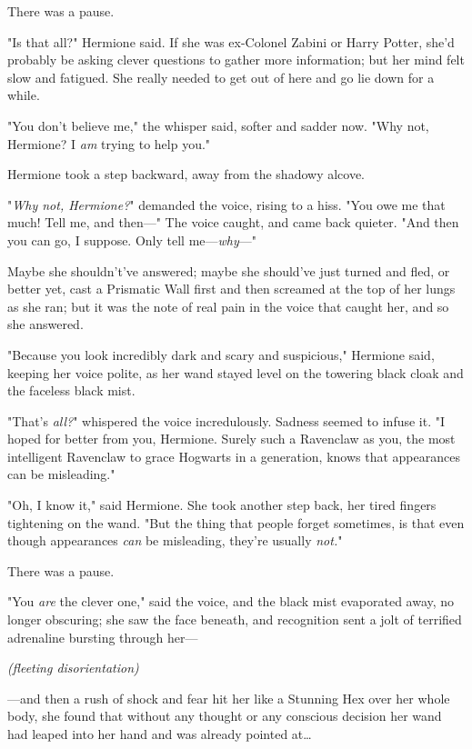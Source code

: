 There was a pause.

"Is that all?" Hermione said. If she was ex-Colonel Zabini or Harry Potter,
she'd probably be asking clever questions to gather more information; but her
mind felt slow and fatigued. She really needed to get out of here and go lie
down for a while.

"You don't believe me," the whisper said, softer and sadder now. "Why not,
Hermione? I \emph{am} trying to help you."

Hermione took a step backward, away from the shadowy alcove.

"\emph{Why not, Hermione?}" demanded the voice, rising to a hiss. "You owe me
that much! Tell me, and then---" The voice caught, and came back quieter. "And
then you can go, I suppose. Only tell me---\emph{why}---"

Maybe she shouldn't've answered; maybe she should've just turned and fled, or
better yet, cast a Prismatic Wall first and then screamed at the top of her
lungs as she ran; but it was the note of real pain in the voice that caught
her, and so she answered.

"Because you look incredibly dark and scary and suspicious," Hermione said,
keeping her voice polite, as her wand stayed level on the towering black cloak
and the faceless black mist.

"That's \emph{all?}" whispered the voice incredulously. Sadness seemed to
infuse it. "I hoped for better from you, Hermione. Surely such a Ravenclaw as
you, the most intelligent Ravenclaw to grace Hogwarts in a generation, knows
that appearances can be misleading."

"Oh, I know it," said Hermione. She took another step back, her tired fingers
tightening on the wand. "But the thing that people forget sometimes, is that
even though appearances \emph{can} be misleading, they're usually \emph{not.}"

There was a pause.

"You \emph{are} the clever one," said the voice, and the black mist evaporated
away, no longer obscuring; she saw the face beneath, and recognition sent a
jolt of terrified adrenaline bursting through her---

\emph{(fleeting disorientation)}

---and then a rush of shock and fear hit her like a Stunning Hex over her whole
body, she found that without any thought or any conscious decision her wand had
leaped into her hand and was already pointed at{\ldots}

